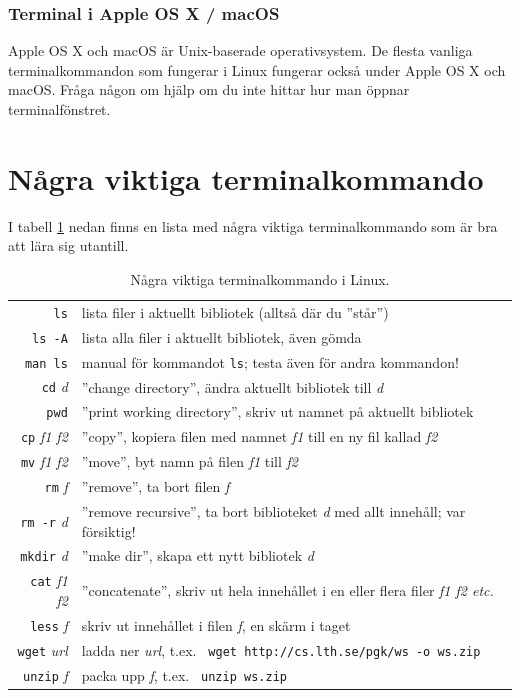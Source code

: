 \subsubsection{Terminal i Apple OS X / macOS}


Apple OS X och macOS är Unix-baserade operativsystem. De flesta vanliga terminalkommandon som fungerar i Linux fungerar också under Apple OS X och macOS. Fråga någon om hjälp om du inte hittar hur man öppnar terminalfönstret.



\section{Några viktiga terminalkommando}

I tabell \ref{fig:terminal:commands} nedan finns en lista med några viktiga terminalkommando som är bra att lära sig utantill.

\begin{table}[H]
\renewcommand{\arraystretch}{1.15}
   
\begin{tabular}{@{}r | l}
\texttt{ls} & lista filer i aktuellt bibliotek (alltså där du ''står'')\\
\texttt{ls -A} & lista alla filer i aktuellt bibliotek, även gömda \\
\texttt{man ls} & manual för kommandot \texttt{ls}; testa även för andra kommandon! \\
\texttt{cd} \textit{d} & ''change directory'', ändra aktuellt bibliotek till \textit{d}\\
\texttt{pwd} & ''print working directory'', skriv ut namnet på aktuellt bibliotek \\
\texttt{cp} \textit{f1 f2} & ''copy'', kopiera filen med namnet \textit{f1} till en ny fil kallad \textit{f2} \\
\texttt{mv} \textit{f1 f2} & ''move'', byt namn på filen \textit{f1} till \textit{f2}  \\
\texttt{rm} \textit{f} & ''remove'', ta bort filen \textit{f}\\
\texttt{rm -r} \textit{d} & ''remove recursive'', ta bort biblioteket \textit{d} med allt innehåll; var försiktig!\\
\texttt{mkdir} \textit{d} & ''make dir'', skapa ett nytt bibliotek \textit{d}\\
\texttt{cat} \textit{f1 f2}& ''concatenate'', skriv ut hela innehållet i en eller flera filer \textit{f1 f2 etc.}\\
\texttt{less} \textit{f}& skriv ut innehållet i filen \textit{f}, en skärm i taget\\
\texttt{wget} \textit{url}&ladda ner \textit{url}, t.ex. \texttt{ wget http://cs.lth.se/pgk/ws -o ws.zip}\\
\texttt{unzip} \textit{f}& packa upp \textit{f}, t.ex. \texttt{ unzip ws.zip}\\
\end{tabular}

    \caption{Några viktiga terminalkommando i Linux.}
    \label{fig:terminal:commands}

\end{table}

